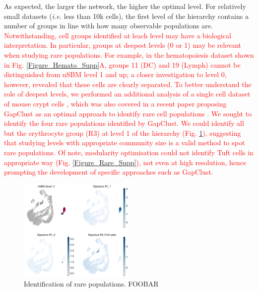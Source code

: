 \documentclass[10pt]{article}
\begin{document}
As expected, the larger the network, the higher the optimal level. For relatively small datasets (\emph{i.e.} less than 10k cells), the first level of the hierarchy contains a number of groups in line with how many observable populations are. 
\textcolor{red}{Notwithstanding, cell groups identified at leach level may have a biological interpretation. In particular, groups at deepest levels (0 or 1) may be relevant when studying rare populations. For example, in the hematopoiesis dataset shown in Fig. \ref{Figure_Hemato_Supp}A, groups 11 (DC) and 19 (Lymph) cannot be distinguished from nSBM level 1 and up; a closer investigation to level 0, however, revealed that these cells are clearly separated. To better understand the role of deepest levels, we performed an additional analysis of a single cell dataset of mouse crypt cells \cite{Ayyaz_Kumar_2019}, which was also covered in a recent paper proposing GapClust as an optimal approach to identify rare cell populations \cite{Fa_Wei_Zhou_Johnston_2021}. We sought to identify the four rare populations identified by GapClust. We could identify all but the erythrocyte group (R3) at level 1 of the hierarchy (Fig. \ref{Figure_Rare_Main}), suggesting that studying levels with appropriate community size is a valid method to spot rare populations. Of note, modularity optimisation could not identify Tuft cells in appropriate way (Fig. \ref{Figure_Rare_Supp}), not even at high resolution, hence prompting the development of specific approaches such as GapClust.} 

\begin{figure}[H]
\centering
\includegraphics[keepaspectratio,width=0.5\textwidth,height=\textheight]{Figure_Rare_Cells_Main.pdf}
\caption[]{Identification of rare populations. FOOBAR} \label{Figure_Rare_Main}
\end{figure}
\end{document}

